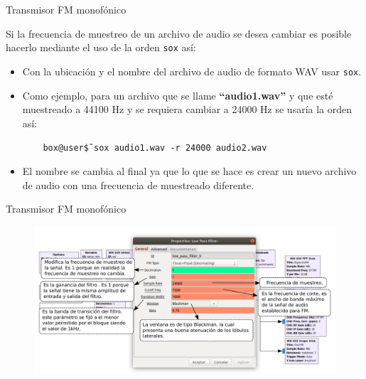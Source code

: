 \begin{frame}{Transmisor FM monofónico}

Si la frecuencia de muestreo de un archivo de audio se desea cambiar es posible hacerlo mediante el uso de la orden \texttt{sox} así:

\begin{itemize}
    \item {Con la ubicación y el nombre del archivo de audio de formato WAV usar \texttt{sox}.}
    \item {Como ejemplo, para un archivo que se llame \textbf{“audio1.wav”} y que esté muestreado a 44100 Hz y se requiera cambiar a 24000 Hz se usaría la orden así:
     \begin{block}{}
    \texttt{
    \ \ \ box@user\~\$ sox audio1.wav -r 24000 audio2.wav  }
    \end{block}}
    \item {El nombre se cambia al final ya que lo que se hace es crear un nuevo archivo de audio con una frecuencia de muestreado diferente.  
}
   
    
\end{itemize}{}

\end{frame}

\begin{frame}{Transmisor FM monofónico}

\begin{figure}[H]
\centering
\vspace{-3mm}
\includegraphics[width=1.1\textwidth]{parte3/lab11/pdf/lab11_5.pdf}
\end{figure}

\end{frame}

